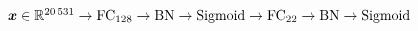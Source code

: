 $\vect{x} \in \real^{\num{20531}}
	\newline \rightarrow \text{FC}_{128} \rightarrow \text{BN} \newline \rightarrow \text{Sigmoid}
	\newline \rightarrow \text{FC}_{22} \rightarrow \text{BN} \newline \rightarrow \text{Sigmoid}$